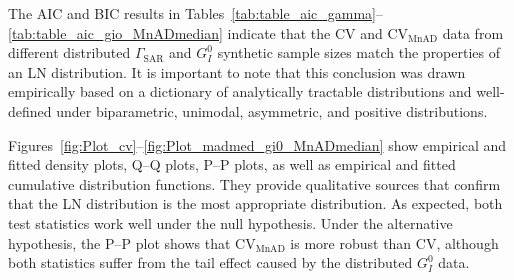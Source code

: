 \documentclass[remotesensing,article,submit,moreauthors,pdftex]{Definitions/mdpi}
\begin{document}
The AIC and BIC results in
Tables~\ref{tab:table_aic_gamma}--\ref{tab:table_aic_gio_MnADmedian}
indicate that the CV and \(\text{CV}_{\text{MnAD}}\) data from different
distributed \(\Gamma_{\text{SAR}}\) and \(G_I^0\) synthetic sample sizes
match the properties of an LN distribution. It is important to note that
this conclusion was drawn empirically based on a dictionary of
analytically tractable distributions and well-defined under
biparametric, unimodal, asymmetric, and positive distributions.

Figures~\ref{fig:Plot_cv}--\ref{fig:Plot_madmed_gi0_MnADmedian} show
empirical and fitted density plots, Q--Q plots, P--P plots, as well as
empirical and fitted cumulative distribution functions. They provide
qualitative sources that confirm that the LN distribution is the most
appropriate distribution. As expected, both test statistics work well
under the null hypothesis. Under the alternative hypothesis, the P--P
plot shows that \(\text{CV}_{\text{MnAD}}\) is more robust than CV,
although both statistics suffer from the tail effect caused by the
distributed \(G_I^0\) data.
\end{document}
